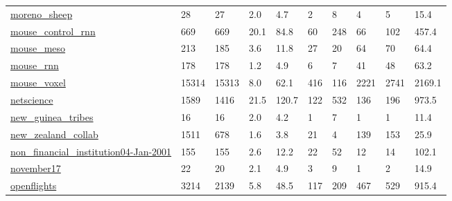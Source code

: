 \begin{longtable}{llllllllll}
 \href{http://konect.cc/networks/moreno_sheep}{moreno\_sheep}                                                                & 28         & 27    & 2.0    & 4.7    & 2     & 8      & 4      & 5      & 15.4    \\
 \href{http://dx.doi.org/\%2010.1016/j.neuron.2021.06.007}{mouse\_control\_rnn}                                                & 669        & 669   & 20.1   & 84.8   & 60    & 248    & 66     & 102    & 457.4   \\
 \href{http://dx.doi.org/\%2010.1038/nature13186}{mouse\_meso}                                                                & 213        & 185   & 3.6    & 11.8   & 27    & 20     & 64     & 70     & 64.4    \\
 \href{http://dx.doi.org/\%2010.1016/j.neuron.2021.06.007}{mouse\_rnn}                                                        & 178        & 178   & 1.2    & 4.9    & 6     & 7      & 41     & 48     & 63.2    \\
 \href{http://dx.doi.org/\%2010.1126/SCIADV.ABB7187}{mouse\_voxel}                                                            & 15314      & 15313 & 8.0    & 62.1   & 416   & 116    & 2221   & 2741   & 2169.1  \\
 \href{http://www-personal.umich.edu/~mejn/netdata/}{netscience}                                                            & 1589       & 1416  & 21.5   & 120.7  & 122   & 532    & 136    & 196    & 973.5   \\
 \href{http://konect.cc/networks/ucidata-gama}{new\_guinea\_tribes}                                                           & 16         & 16    & 2.0    & 4.2    & 1     & 7      & 1      & 1      & 11.4    \\
 \href{https://doi.org/10.6084/m9.figshare.5705167}{new\_zealand\_collab}                                                     & 1511       & 678   & 1.6    & 3.8    & 21    & 4      & 139    & 153    & 25.9    \\
 \href{https://doi.org/10.5061/dryad.5b8n621}{non\_financial\_institution04-Jan-2001}                                         & 155        & 155   & 2.6    & 12.2   & 22    & 52     & 12     & 14     & 102.1   \\
 \href{https://sites.google.com/site/ucinetsoftware/datasets/covert-networks/rhodesbombing}{november17}                     & 22         & 20    & 2.1    & 4.9    & 3     & 9      & 1      & 2      & 14.9    \\
 \href{https://openflights.org/data.html}{openflights}                                                                      & 3214       & 2139  & 5.8    & 48.5   & 117   & 209    & 467    & 529    & 915.4   \\

\end{longtable}
